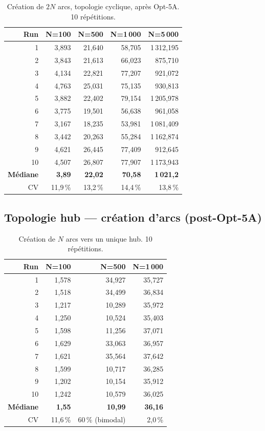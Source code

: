 \begin{table}[h]
\centering
\caption{Création de $2N$ arcs, topologie cyclique, après Opt-5A.
10 répétitions.}
\begin{tabular}{rrrrr}
\hline
\textbf{Run} & \textbf{N=100} & \textbf{N=500} & \textbf{N=1\,000} & \textbf{N=5\,000} \\
\hline
1  & 3,893 & 21,640 & 58,705 & 1\,312,195 \\
2  & 3,843 & 21,613 & 66,023 &    875,710 \\
3  & 4,134 & 22,821 & 77,207 &    921,072 \\
4  & 4,763 & 25,031 & 75,135 &    930,813 \\
5  & 3,882 & 22,402 & 79,154 & 1\,205,978 \\
6  & 3,775 & 19,501 & 56,638 &    961,058 \\
7  & 3,167 & 18,235 & 53,981 & 1\,081,409 \\
8  & 3,442 & 20,263 & 55,284 & 1\,162,874 \\
9  & 4,621 & 26,445 & 77,409 &    912,645 \\
10 & 4,507 & 26,807 & 77,907 & 1\,173,943 \\
\hline
\textbf{Médiane} & \textbf{3,89} & \textbf{22,02} & \textbf{70,58} & \textbf{1\,021,2} \\
CV               & 11,9\,\%      & 13,2\,\%       & 14,4\,\%       & 13,8\,\% \\
\hline
\end{tabular}
\end{table}

\subsection*{Topologie hub --- création d'arcs (post-Opt-5A)}

\begin{table}[h]
\centering
\caption{Création de $N$ arcs vers un unique hub. 10 répétitions.}
\begin{tabular}{rrrr}
\hline
\textbf{Run} & \textbf{N=100} & \textbf{N=500} & \textbf{N=1\,000} \\
\hline
1  & 1,578 & 34,927 & 35,727 \\
2  & 1,518 & 34,499 & 36,834 \\
3  & 1,217 & 10,289 & 35,972 \\
4  & 1,250 & 10,524 & 35,403 \\
5  & 1,598 & 11,256 & 37,071 \\
6  & 1,629 & 33,063 & 36,957 \\
7  & 1,621 & 35,564 & 37,642 \\
8  & 1,599 & 10,717 & 36,285 \\
9  & 1,202 & 10,154 & 35,912 \\
10 & 1,242 & 10,579 & 36,025 \\
\hline
\textbf{Médiane} & \textbf{1,55} & \textbf{10,99} & \textbf{36,16} \\
CV               & 11,6\,\%      & 60\,\% (bimodal)& 2,0\,\% \\
\hline
\end{tabular}
\end{table}


